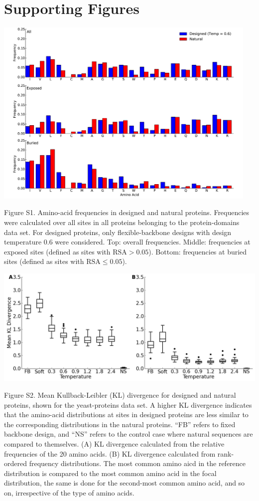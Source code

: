 \documentclass[12pt]{article}
\makeatletter
\newcommand{\customlabel}[2]{%
\protected@write \@auxout {}{\string \newlabel {#1}{{#2}{}}}}
\makeatother
\begin{document}
\cleardoublepage

\section{Supporting Figures}

\centerline{\includegraphics[width = 5in]{figures/Noah_Freq_Combo_Plots_06.pdf}}

\noindent Figure S1. Amino-acid frequencies in designed and natural proteins. Frequencies were calculated over all sites in all proteins belonging to the protein-domains data set. For designed proteins, only flexible-backbone designs with design temperature 0.6 were considered. Top: overall frequencies. Middle: frequencies at exposed sites (defined as sites with $\text{RSA}>0.05$). Bottom: frequencies at buried sites (defined as sites with $\text{RSA}\leq0.05$).

\customlabel{AAFreqsProteinDomains}{S1}

\centerline{\includegraphics[width = 6in]{figures/Mean_KL_vs_Temp_Boxplot_Noah.png}}
\noindent Figure S2. Mean Kullback-Leibler (KL) divergence for designed and natural proteins, shown for the yeast-proteins data set. A higher KL divergence indicates that the amino-acid distributions at sites in designed proteins are less similar to the corresponding distributions in the natural proteins. ``FB'' refers to fixed backbone design, and ``NS'' refers to the control case where natural sequences are compared to themselves. (A) KL divergence calculated from the relative frequencies of the 20 amino acids. (B) KL divergence calculated from rank-ordered frequency distributions. The most common amino aicd in the reference distribution is compared to the most common amino acid in the focal distribution, the same is done for the second-most common amino acid, and so on, irrespective of the type of amino acids.
\end{document}
